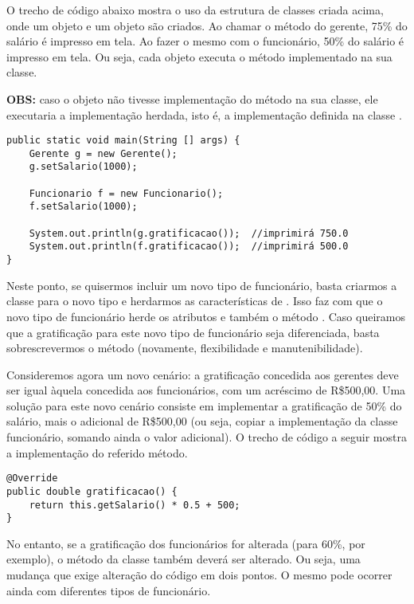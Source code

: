 O trecho de código abaixo mostra o uso da estrutura de classes criada acima, onde um objeto  e um objeto  são criados. Ao chamar o método  do gerente, 75\% do salário é impresso em tela. Ao fazer o mesmo com o funcionário, 50\% do salário é impresso em tela. Ou seja, cada objeto executa o método implementado na sua classe.

\textbf{OBS:} caso o objeto não tivesse implementação do método na sua classe, ele executaria a implementação herdada, isto é, a implementação definida na classe .

\begin{verbatim}
public static void main(String [] args) {
	Gerente g = new Gerente();
	g.setSalario(1000);
	
	Funcionario f = new Funcionario();
	f.setSalario(1000);
	
	System.out.println(g.gratificacao());  //imprimirá 750.0
	System.out.println(f.gratificacao());  //imprimirá 500.0
}
\end{verbatim}
 
Neste ponto, se quisermos incluir um novo tipo de funcionário, basta criarmos a classe para o novo tipo e herdarmos as características de . Isso faz com que o novo tipo de funcionário herde os atributos e também o método . Caso queiramos que a gratificação para este novo tipo de funcionário seja diferenciada, basta sobrescrevermos o método  (novamente, flexibilidade e manutenibilidade).

Consideremos agora um novo cenário: a gratificação concedida aos gerentes deve ser igual àquela concedida aos funcionários, com um acréscimo de R\$500,00. Uma solução para este novo cenário consiste em implementar a gratificação de 50\% do salário, mais o adicional de R\$500,00 (ou seja, copiar a implementação da classe funcionário, somando ainda o valor adicional). O trecho de código a seguir mostra a implementação do referido método.

\begin{verbatim}
@Override
public double gratificacao() {
	return this.getSalario() * 0.5 + 500;
}
\end{verbatim}

No entanto, se a gratificação dos funcionários for alterada (para 60\%, por exemplo), o método da classe  também deverá ser alterado. Ou seja, uma mudança que exige alteração do código em dois pontos. O mesmo pode ocorrer ainda com diferentes tipos de funcionário.

